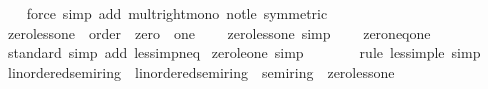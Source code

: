 \begin{isabellebody}
%
\isadelimproof
\ \ %
\endisadelimproof
%
\isatagproof
{}\isamarkupfalse%
\ {\isacharparenleft}{\kern0pt}force\ simp\ add{\isacharcolon}{\kern0pt}\ mult{\isacharunderscore}{\kern0pt}right{\isacharunderscore}{\kern0pt}mono\ not{\isacharunderscore}{\kern0pt}le\ {\isacharbrackleft}{\kern0pt}symmetric{\isacharbrackright}{\kern0pt}{\isacharparenright}{\kern0pt}%
\endisatagproof
{\isafoldproof}%
%
\isadelimproof
\isanewline
%
\endisadelimproof
\isanewline
{}\isamarkupfalse%
\isanewline
\isanewline
{}\isamarkupfalse%
\ zero{\isacharunderscore}{\kern0pt}less{\isacharunderscore}{\kern0pt}one\ {\isacharequal}{\kern0pt}\ order\ {\isacharplus}{\kern0pt}\ zero\ {\isacharplus}{\kern0pt}\ one\ {\isacharplus}{\kern0pt}\isanewline
\ \ \ zero{\isacharunderscore}{\kern0pt}less{\isacharunderscore}{\kern0pt}one\ {\isacharbrackleft}{\kern0pt}simp{\isacharbrackright}{\kern0pt}{\isacharcolon}{\kern0pt}\ {\isachardoublequoteopen}{}\ {\isacharless}{\kern0pt}\ {}{\isachardoublequoteclose}\isanewline
{}\isanewline
\isanewline
{}\isamarkupfalse%
\ zero{\isacharunderscore}{\kern0pt}neq{\isacharunderscore}{\kern0pt}one\isanewline
%
\isadelimproof
\ \ %
\endisadelimproof
%
\isatagproof
{}\isamarkupfalse%
\ standard\ {\isacharparenleft}{\kern0pt}simp\ add{\isacharcolon}{\kern0pt}\ less{\isacharunderscore}{\kern0pt}imp{\isacharunderscore}{\kern0pt}neq{\isacharparenright}{\kern0pt}%
\endisatagproof
{\isafoldproof}%
%
\isadelimproof
\isanewline
%
\endisadelimproof
\isanewline
{}\isamarkupfalse%
\ zero{\isacharunderscore}{\kern0pt}le{\isacharunderscore}{\kern0pt}one\ {\isacharbrackleft}{\kern0pt}simp{\isacharbrackright}{\kern0pt}{\isacharcolon}{\kern0pt}\isanewline
\ \ {\isacartoucheopen}{}\ {\isasymle}\ {}{\isacartoucheclose}%
\isadelimproof
\ %
\endisadelimproof
%
\isatagproof
{}\isamarkupfalse%
\ {\isacharparenleft}{\kern0pt}rule\ less{\isacharunderscore}{\kern0pt}imp{\isacharunderscore}{\kern0pt}le{\isacharparenright}{\kern0pt}\ simp%
\endisatagproof
{\isafoldproof}%
%
\isadelimproof
%
\endisadelimproof
\isanewline
\isanewline
{}\isamarkupfalse%
\isanewline
\isanewline
{}\isamarkupfalse%
\ linordered{\isacharunderscore}{\kern0pt}semiring{\isacharunderscore}{\kern0pt}{}\ {\isacharequal}{\kern0pt}\ linordered{\isacharunderscore}{\kern0pt}semiring\ {\isacharplus}{\kern0pt}\ semiring{\isacharunderscore}{\kern0pt}{}\ {\isacharplus}{\kern0pt}\ zero{\isacharunderscore}{\kern0pt}less{\isacharunderscore}{\kern0pt}one\isanewline

\end{isabellebody}
